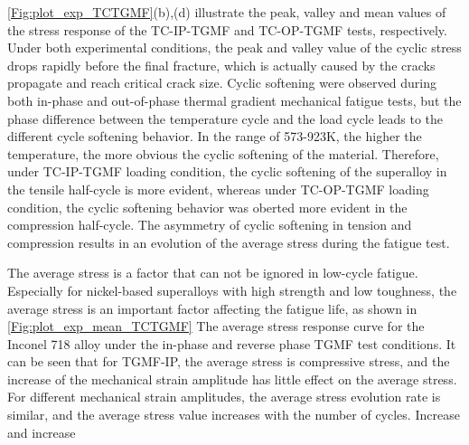 \ref{Fig:plot_exp_TCTGMF}(b),(d) illustrate the peak, valley and mean values of the stress response of the TC-IP-TGMF and TC-OP-TGMF tests, respectively.
Under both experimental conditions, the peak and valley value of the cyclic stress drops rapidly before the final fracture, which is actually caused by the cracks propagate and reach critical crack size.
Cyclic softening were observed during both in-phase and out-of-phase thermal gradient mechanical fatigue tests, but the phase difference between the temperature cycle and the load cycle leads to the different cycle softening behavior. In the range of 573-923K, the higher the temperature, the more obvious the cyclic softening of the material. Therefore, under TC-IP-TGMF loading condition, the cyclic softening of the superalloy in the tensile half-cycle is more evident, whereas under TC-OP-TGMF loading condition, the cyclic softening behavior was oberted more evident in the compression half-cycle. The asymmetry of cyclic softening in tension and compression results in an evolution of the average stress during the fatigue test.


The average stress is a factor that can not be ignored in low-cycle fatigue. Especially for nickel-based superalloys with high strength and low toughness, the average stress is an important factor affecting the fatigue life, as shown in \ref{Fig:plot_exp_mean_TCTGMF} The average stress response curve for the Inconel 718 alloy under the in-phase and reverse phase TGMF test conditions. It can be seen that for TGMF-IP, the average stress is compressive stress, and the increase of the mechanical strain amplitude has little effect on the average stress. For different mechanical strain amplitudes, the average stress evolution rate is similar, and the average stress value increases with the number of cycles. Increase and increase

